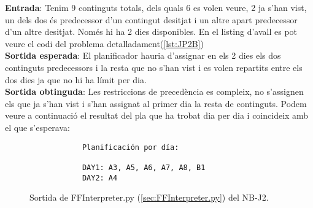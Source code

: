 \documentclass[a4paper]{article}
\begin{document}
	\noindent \textbf{Entrada}: Tenim 9 continguts totals, dels quals 6 es volen veure, 2 ja s'han vist, un dels dos és predecessor d'un contingut desitjat i un altre apart predecessor d'un altre desitjat. Només hi ha 2 dies disponibles. En el listing d'avall es pot veure el codi del problema detalladament(\ref{lst:JP2B}) \\
	
	\noindent \textbf{Sortida esperada}: El planificador hauria d'assignar en els 2 dies els dos continguts predecessors i la resta que no s'han vist i es volen repartits entre els dos dies ja que no hi ha límit per dia. \\
	
	\noindent \textbf{Sortida obtinguda}: Les restriccions de precedència es compleix, no s'assignen els que ja s'han vist i s'han assignat al primer dia la resta de continguts. Podem veure a continuació el resultat del pla que ha trobat dia per dia i coincideix amb el que s'esperava:
	
	\begin{figure}[H]
		\centering
		\begin{verbatim}
			Planificación por día:
			
			DAY1: A3, A5, A6, A7, A8, B1
			DAY2: A4
		\end{verbatim}
		\caption{Sortida de FFInterpreter.py (\ref{sec:FFInterpreter.py}) del NB-J2.}
	\end{figure}
	
	
	
\end{document}
